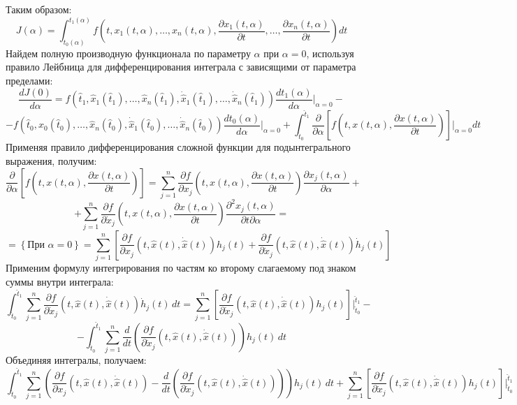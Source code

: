 Таким образом:
$$J(\alpha) = \int_{t_0(\alpha)}^{t_1(\alpha)} f\left(t, x_1(t, \alpha), \dots, x_n(t, \alpha), \frac{\partial x_1(t, \alpha)}{\partial t}, \dots, \frac{\partial x_n(t, \alpha)}{\partial t}\right) dt$$
Найдем полную производную функционала по параметру $\alpha$ при $\alpha = 0$,
используя правило Лейбница для дифференцирования интеграла с зависящими от параметра пределами:
$$\frac{d J(0)}{d \alpha} = f\left(\hat{t}_1, \hat{x}_1(\hat{t}_1), \dots, \hat{x}_n(\hat{t}_1), \dot{\hat{x}}_1(\hat{t}_1), \dots, \dot{\hat{x}}_n(\hat{t}_1)\right) \frac{d t_1(\alpha)}{d \alpha}\bigg|_{\alpha=0} -$$
$$- f\left(\hat{t}_0, \hat{x}_0(\hat{t}_0), \dots, \hat{x}_n(\hat{t}_0), \dot{\hat{x}}_1(\hat{t}_0), \dots, \dot{\hat{x}}_n(\hat{t}_0)\right) \frac{d t_0(\alpha)}{d \alpha}\bigg|_{\alpha=0} + \int_{\hat{t}_0}^{\hat{t}_1} \frac{\partial}{\partial \alpha} \left[ f\left(t, x(t, \alpha), \frac{\partial x(t, \alpha)}{\partial t}\right) \right]\bigg|_{\alpha=0} dt$$
Применяя правило дифференцирования сложной функции для подынтегрального выражения, получим:
$$\frac{\partial}{\partial \alpha} \left[ f\left(t, x(t, \alpha), \frac{\partial x(t, \alpha)}{\partial t}\right) \right]
= \sum_{j=1}^n \frac{\partial f}{\partial x_j}\left(t, x(t, \alpha), \frac{\partial x(t, \alpha)}{\partial t}\right) \frac{\partial x_j(t, \alpha)}{\partial \alpha}+$$
$$+ \sum_{j=1}^n \frac{\partial f}{\partial \dot{x}_j}\left(t, x(t, \alpha), \frac{\partial x(t, \alpha)}{\partial t}\right) \frac{\partial^2 x_j(t, \alpha)}{\partial t \partial \alpha}=$$
$$
=\left\{ \text{При } \alpha = 0\right\} 
=\sum_{j=1}^n \left[ \frac{\partial f}{\partial x_j}\left(t, \hat{x}(t), \dot{\hat{x}}(t)\right) h_j(t) 
+ \frac{\partial f}{\partial \dot{x}_j}\left(t, \hat{x}(t), \dot{\hat{x}}(t)\right) \dot{h}_j(t) \right]$$
Применим формулу интегрирования по частям ко второму слагаемому под знаком суммы внутри интеграла:
$$\int_{\hat{t}_0}^{\hat{t}_1} \sum_{j=1}^n \frac{\partial f}{\partial \dot{x}_j}\left(t, \hat{x}(t), \dot{\hat{x}}(t)\right) \dot{h}_j(t) \, dt = \sum_{j=1}^n \left[ \frac{\partial f}{\partial \dot{x}_j}\left(t, \hat{x}(t), \dot{\hat{x}}(t)\right) h_j(t) \right]\bigg|_{\hat{t}_0}^{\hat{t}_1}-$$
$$- \int_{\hat{t}_0}^{\hat{t}_1} \sum_{j=1}^n \frac{d}{dt}\left( \frac{\partial f}{\partial \dot{x}_j}\left(t, \hat{x}(t), \dot{\hat{x}}(t)\right) \right) h_j(t) \, dt$$
Объединяя интегралы, получаем:
$$\int_{\hat{t}_0}^{\hat{t}_1} \sum_{j=1}^n \left( \frac{\partial f}{\partial x_j}\left(t, \hat{x}(t), \dot{\hat{x}}(t)\right) - \frac{d}{dt}\left( \frac{\partial f}{\partial \dot{x}_j}\left(t, \hat{x}(t), \dot{\hat{x}}(t)\right) \right) \right) h_j(t) \, dt + \sum_{j=1}^n \left[ \frac{\partial f}{\partial \dot{x}_j}\left(t, \hat{x}(t), \dot{\hat{x}}(t)\right) h_j(t) \right]\bigg|_{\hat{t}_0}^{\hat{t}_1}$$
